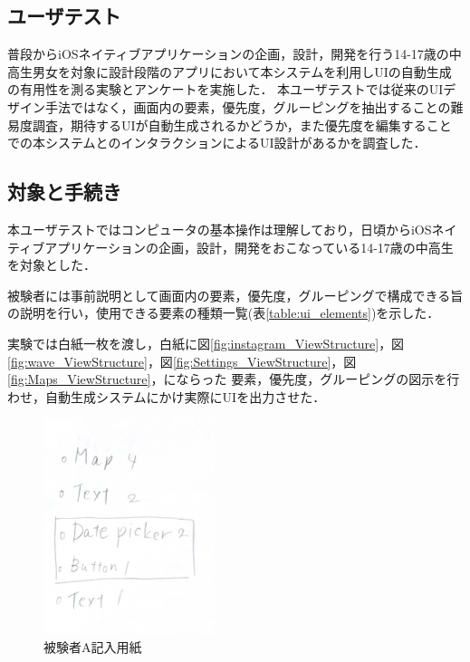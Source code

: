 \subsection{ユーザテスト}
普段からiOSネイティブアプリケーションの企画，設計，開発を行う14-17歳の中高生男女を対象に設計段階のアプリにおいて本システムを利用しUIの自動生成の有用性を測る実験とアンケートを実施した．
本ユーザテストでは従来のUIデザイン手法ではなく，画面内の要素，優先度，グルーピングを抽出することの難易度調査，期待するUIが自動生成されるかどうか，また優先度を編集することでの本システムとのインタラクションによるUI設計があるかを調査した．
\subsection{対象と手続き}
本ユーザテストではコンピュータの基本操作は理解しており，日頃からiOSネイティブアプリケーションの企画，設計，開発をおこなっている14-17歳の中高生を対象とした．

被験者には事前説明として画面内の要素，優先度，グルーピングで構成できる旨の説明を行い，使用できる要素の種類一覧(表\ref{table:ui_elements})を示した．

実験では白紙一枚を渡し，白紙に図\ref{fig:instagram_ViewStructure}，図\ref{fig:wave_ViewStructure}，図\ref{fig:Settings_ViewStructure}，図\ref{fig:Maps_ViewStructure}，にならった 要素，優先度，グルーピングの図示を行わせ，自動生成システムにかけ実際にUIを出力させた．


\begin{figure}[htbp]
  \begin{minipage}{\hsize}
    \begin{center}
       \includegraphics[width=50mm]{img/usertest_viewstructure_1.png}
    \end{center}
    \caption{被験者A記入用紙}
    \label{fig:usertest_viewstructure_1}
  \end{minipage}
\end{figure}

